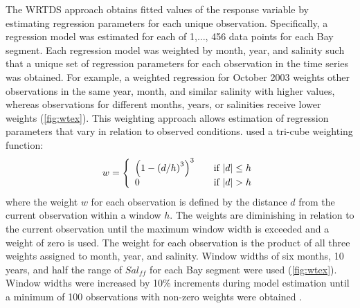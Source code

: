 \documentclass[letterpaper,12pt,oneside]{article}\usepackage[]{graphicx}\usepackage[]{color}
\begin{document}
The \ac{WRTDS} approach obtains fitted values of the response variable by estimating regression parameters for each unique observation.  Specifically, a regression model was estimated for each of 1,$\ldots$, 456 data points for each Bay segment. Each regression model was weighted by month, year, and salinity such that a unique set of regression parameters for each observation in the time series was obtained. For example, a weighted regression for October 2003 weights other observations in the same year, month, and similar salinity with higher values, whereas observations for different months, years, or salinities receive lower weights (\cref{fig:wtex}).  This weighting approach allows estimation of regression parameters that vary in relation to observed conditions.  \citet{Hirsch10} used a tri-cube weighting function:
\begin{equation}
w= \left\{ 
  \begin{array}{l l}
    \left(1-\left(d/h\right)^3\right)^3 & \quad \textrm{if } |d| \leq h \\
    0 & \quad \textrm{if } |d| > h 
  \end{array} \right.
\end{equation}
\noindent where the weight $w$ for each observation is defined by the distance $d$ from the current observation within a window $h$. The weights are diminishing in relation to the current observation until the maximum window width is exceeded and a weight of zero is used.  The weight for each observation is the product of all three weights assigned to month, year, and salinity.  Window widths of six months, 10 years, and half the range of $Sal_{ff}$ for each Bay segment were used (\cref{fig:wtex}).  Window widths were increased by 10\% increments during model estimation until a minimum of 100 observations with non-zero weights were obtained \citep{Hirsch10}.
\end{document}
